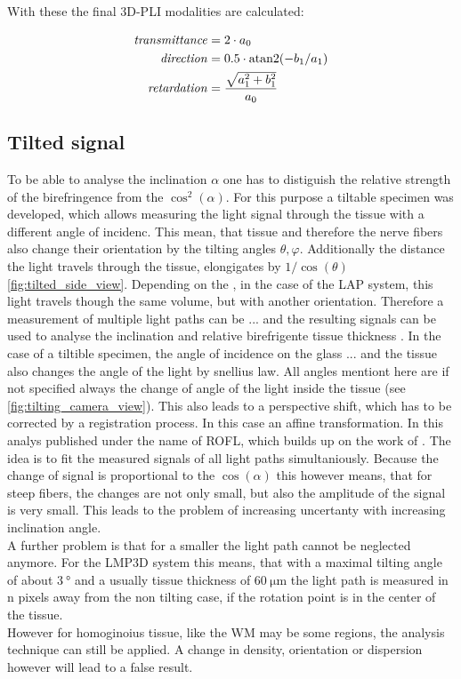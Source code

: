 With these the final \ac{3D-PLI} modalities are calculated:

\begin{align}
\begin{split}
\mathit{transmittance} &= 2 \cdot a_0\\
\mathit{direction} &= 0.5 \cdot \operatorname{atan2}(-b_1 / a_1)\\
\mathit{retardation} &= \frac{\sqrt{a_1^2 + b_1^2}}{a_0}
\end{split}
\end{align}



% 
\subsection{Tilted signal}
% 
To be able to analyse the inclination $\alpha$ one has to distiguish the relative strength of the birefringence from the $\cos^2(\alpha)$.
For this purpose a tiltable specimen was developed, which allows measuring the light signal through the tissue with a different angle of incidenc.
This mean, that tissue and therefore the nerve fibers also change their orientation by the tilting angles $\theta, \varphi$.
Additionally the distance the light travels through the tissue, elongigates by $1/\cos(\theta)$ \cref{fig:tilted_side_view}.
% 
Depending on the \pixelsize{}, in the case of the \ac{LAP} system, this light travels though the same volume, but with another orientation.
Therefore a measurement of multiple light paths can be ... and the resulting signals can be used to analyse the inclination and relative birefrigente tissue thickness \trel{}.
In the case of a tiltible specimen, the angle of incidence on the glass ... and the tissue also changes the angle of the light by snellius law.
All angles mentiont here are if not specified always the change of angle of the light inside the tissue (see \cref{fig:tilting_camera_view}). 
This also leads to a perspective shift, which has to be corrected by a registration process.
In this case an affine transformation.
% 
In \cite{Schmitz2018} this analys published under the name of \ac{ROFL}, which builds up on the work of \cite{Wiese:887678}.
The idea is to fit the measured signals of all light paths simultaniously.
Because the change of signal is proportional to the $\cos(\alpha)$ this however means, that for steep fibers, the changes are not only small, but also the amplitude of the signal is very small.
This leads to the problem of increasing uncertanty with increasing inclination angle.
\\
A further problem is that for a smaller \pixelsize{} the light path cannot be neglected anymore.
For the \ac{LMP3D} system this means, that with a maximal tilting angle of about $\SI{3}{\degree}$ and a usually tissue thickness of $\SI{60}{\micro\meter}$ the light path is measured in n pixels away from the non tilting case, if the rotation point is in the center of the tissue.
\\
However for homoginoius tissue, like the \ac{WM} may be some regions, the analysis technique can still be applied.
A change in density, orientation or dispersion however will lead to a false result.
% 
% 
% 
